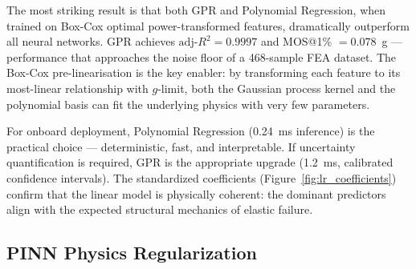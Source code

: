\documentclass[10pt,letterpaper]{article}
\newcommand{\adjRsq}{\text{adj-}R^2}
\begin{document}
The most striking result is that both GPR and Polynomial Regression, when trained on
Box-Cox optimal power-transformed features, dramatically outperform all neural networks.
GPR achieves $\adjRsq = 0.9997$ and MOS@1\% $= 0.078$~g --- performance that approaches
the noise floor of a 468-sample FEA dataset. The Box-Cox pre-linearisation is the key
enabler: by transforming each feature to its most-linear relationship with $g$-limit, both
the Gaussian process kernel and the polynomial basis can fit the underlying physics with very
few parameters.

For onboard deployment, Polynomial Regression (0.24~ms inference) is the practical choice
--- deterministic, fast, and interpretable. If uncertainty quantification is required, GPR
is the appropriate upgrade (1.2~ms, calibrated confidence intervals). The standardized
coefficients (Figure~\ref{fig:lr_coefficients}) confirm that the linear model is physically
coherent: the dominant predictors align with the expected structural mechanics of elastic
failure.

\subsection{PINN Physics Regularization}
\end{document}
